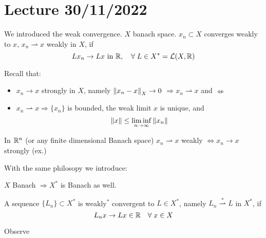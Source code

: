 \section{Lecture 30/11/2022}

We introduced the weak convergence. \(X\) banach space. \({x_n} \subset X\) converges weakly to \(x\), \(x_n \rightharpoonup x\) weakly in \(X\), if 
\[
    L x_n \to Lx \text { in } \mathbb{R}, \quad \forall\; L \in X^* = \mathcal{L}(X, \mathbb{R})
\]

Recall that: 
\begin{itemize}
    \item \(x_n \to x \) strongly in \(X\), namely \(\norm{x_n - x}_X \to 0\) \(\Rightarrow x_n \rightharpoonup x\) and \(\nLeftarrow\)
    \item \(x_n \rightharpoonup x \Rightarrow \{x_n\}\) is bounded, the weak limit \(x\) is unique, and 
    \[
        \norm{x} \leq \liminf _{n \to \infty} \norm{x_n}
    \]
\end{itemize}

\begin{remark}
    In \(\mathbb{R}^n\) (or any finite dimensional Banach space) \(x_n \rightharpoonup x\) weakly \(\iff x_n \to x\) strongly (ex.)
\end{remark}

With the same philosopy we introduce: 
\begin{definition}
    \(X \) Banach \(\Rightarrow X^* \) is Banach as well.
\end{definition}
\begin{definition}
    A sequence \(\{L_n \} \subset X^*\) is weakly\(^*\) convergent to \(L \in  X^*\), namely \(L_n \overset{*}{\rightharpoonup} L\) in \(X^*\), if 
    \[
        L_n x \to Lx \in \mathbb{R} \quad \forall\; x \in X
    \]
\end{definition}
\begin{remark}
    Observe
\end{remark}